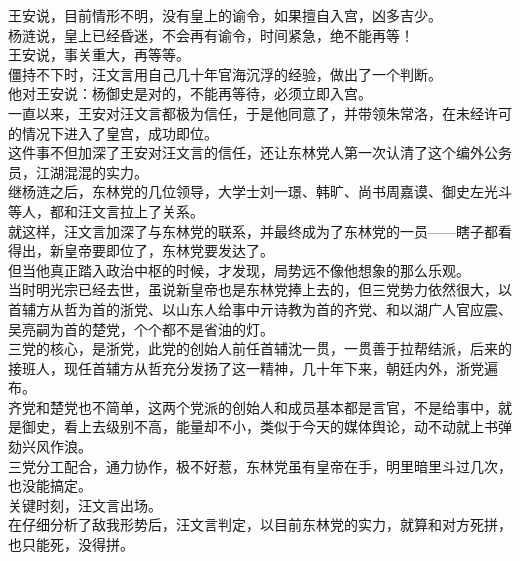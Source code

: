 \begin{multicols}{\theparacolNo}
王安说，目前情形不明，没有皇上的谕令，如果擅自入宫，凶多吉少。\\

杨涟说，皇上已经昏迷，不会再有谕令，时间紧急，绝不能再等！\\

王安说，事关重大，再等等。\\

僵持不下时，汪文言用自己几十年官海沉浮的经验，做出了一个判断。\\

他对王安说：杨御史是对的，不能再等待，必须立即入宫。\\

一直以来，王安对汪文言都极为信任，于是他同意了，并带领朱常洛，在未经许可的情况下进入了皇宫，成功即位。\\

这件事不但加深了王安对汪文言的信任，还让东林党人第一次认清了这个编外公务员，江湖混混的实力。\\

继杨涟之后，东林党的几位领导，大学士刘一璟、韩旷、尚书周嘉谟、御史左光斗等人，都和汪文言拉上了关系。\\

就这样，汪文言加深了与东林党的联系，并最终成为了东林党的一员——瞎子都看得出，新皇帝要即位了，东林党要发达了。\\

但当他真正踏入政治中枢的时候，才发现，局势远不像他想象的那么乐观。\\

当时明光宗已经去世，虽说新皇帝也是东林党捧上去的，但三党势力依然很大，以首辅方从哲为首的浙党、以山东人给事中亓诗教为首的齐党、和以湖广人官应震、吴亮嗣为首的楚党，个个都不是省油的灯。\\

三党的核心，是浙党，此党的创始人前任首辅沈一贯，一贯善于拉帮结派，后来的接班人，现任首辅方从哲充分发扬了这一精神，几十年下来，朝廷内外，浙党遍布。\\

齐党和楚党也不简单，这两个党派的创始人和成员基本都是言官，不是给事中，就是御史，看上去级别不高，能量却不小，类似于今天的媒体舆论，动不动就上书弹劾兴风作浪。\\

三党分工配合，通力协作，极不好惹，东林党虽有皇帝在手，明里暗里斗过几次，也没能搞定。\\

关键时刻，汪文言出场。\\

在仔细分析了敌我形势后，汪文言判定，以目前东林党的实力，就算和对方死拼，也只能死，没得拼。\\


\end{multicols}

